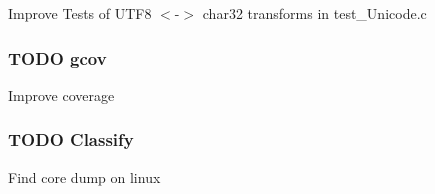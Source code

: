 \begin{DoxyItemize}
\item Improve Tests of U\+T\+F8 $<$-\/$>$ char32 transforms in test\+\_\+\+Unicode.\+c
\end{DoxyItemize}

\subsubsection*{T\+O\+D\+O gcov}


\begin{DoxyItemize}
\item Improve coverage
\end{DoxyItemize}

\subsubsection*{T\+O\+D\+O Classify}


\begin{DoxyItemize}
\item Find core dump on linux 
\end{DoxyItemize}